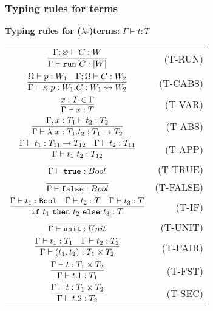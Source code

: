 \subsubsection{Typing rules for terms}
\noindent \textbf{Typing rules for ($\lambda$-)terms}: $\boxed{\Gamma\vdash t:T}$

\renewcommand\arraystretch{3}
\begin{longtable}[c]{cr}
  $\infer{\Gamma\vdash \trun\ C : |W| }{\Gamma;\varnothing \vdash C:W}$ &(T-RUN)\\
  $\infer{\Gamma\vdash \kappa\ p:W_1 . C: W_1\leadsto W_2 }{\Omega\vdash p:W_1 &\Gamma;\Omega\vdash C:W_2}$ &(T-CABS)\\
  $\infer{\Gamma\vdash x:T}{x:T\in \Gamma}$ &(T-VAR)\\
  $\infer{\Gamma\vdash \lambda\ x:T_1.t_2 : T_1\to T_2}{\Gamma,x:T_1 \vdash t_2:T_2}$ &(T-ABS)\\
  $\infer{\Gamma\vdash t_1\ t_2 : T_{12}}{\Gamma\vdash t_1:T_{11}\to T_{12} & \Gamma\vdash t_2:T_{11}}$ &(T-APP)\\
  $\infer{\Gamma\vdash\true : Bool}{}$ &(T-TRUE)\\
  $\infer{\Gamma\vdash\false : Bool}{}$ &(T-FALSE)\\
  $\infer{\tif\ t_1\ \tthen\ t_2\ \telse\ t_3 : T}{\Gamma\vdash t_1:\Bool &\Gamma\vdash t_2:T &\Gamma\vdash t_3:T}$ &(T-IF)\\
  $\infer{\Gamma\vdash\unit : Unit}{}$ &(T-UNIT)\\
  $\infer{\Gamma\vdash (t_1,t_2) : T_1\times T_2}{\Gamma\vdash t_1:T_1 &\Gamma\vdash t_2:T_2}$ &(T-PAIR)\\
  $\infer{\Gamma\vdash t.1 : T_1}{\Gamma\vdash t : T_1\times T_2}$ &(T-FST)\\
  $\infer{\Gamma\vdash t.2 : T_2}{\Gamma\vdash t : T_1\times T_2}$ &(T-SEC)\\
\end{longtable}

